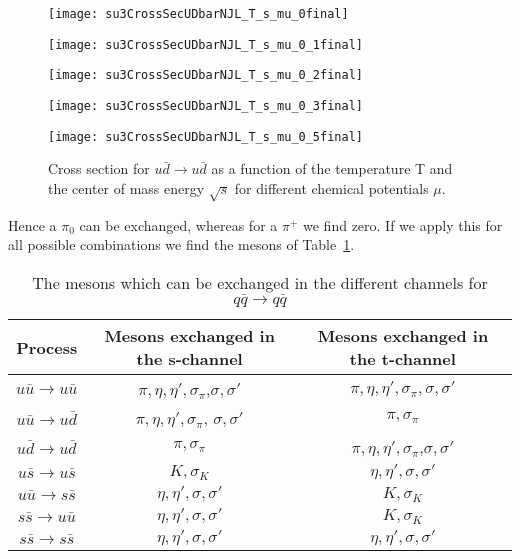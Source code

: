 \documentclass[a4paper]{jpconf}
\begin{document}
\begin{figure}[htp]%
\centering
\begin{minipage}{0.49\textwidth}
\centering
\texttt{[image: su3CrossSecUDbarNJL\_T\_s\_mu\_0final]}
\end{minipage}
\hfill
\begin{minipage}{0.49\textwidth}
\texttt{[image: su3CrossSecUDbarNJL\_T\_s\_mu\_0\_1final]}
\end{minipage}
\hfill
\begin{minipage}{0.49\textwidth}
\texttt{[image: su3CrossSecUDbarNJL\_T\_s\_mu\_0\_2final]}
\end{minipage}
\hfill
\begin{minipage}{0.49\textwidth}
\texttt{[image: su3CrossSecUDbarNJL\_T\_s\_mu\_0\_3final]}
\end{minipage}
\hfill
\begin{minipage}{0.49\textwidth}
\texttt{[image: su3CrossSecUDbarNJL\_T\_s\_mu\_0\_5final]}
\end{minipage}
\caption{\label{fig:udbar}Cross section for $u\bar{d} \rightarrow u\bar{d}$ as a function of the temperature T and the center of mass energy  $\sqrt{s}$ for different chemical potentials $\mu$.}
\end{figure}
Hence a $\pi_0$ can be exchanged, whereas for a $\pi^+$ we find zero. If we apply this for all possible combinations we find the mesons of Table~\ref{tab:qqbar}.
\begin{table}
\centering
\caption{\label{tab:qqbar}The mesons which can be exchanged in the different channels for  $q\bar{q}\rightarrow q\bar{q}$}
\begin{tabular}{|c | c | c |}
\hline
Process & Mesons exchanged in the s-channel & Mesons exchanged in the  t-channel \\ \hline
$u\bar{u} \rightarrow u\bar{u}$ &$ \pi, \eta, \eta',\sigma_{\pi}$,$ \sigma, \sigma' $&$ \pi, \eta, \eta',\sigma_{\pi}, \sigma, \sigma' $\\ \hline
$u\bar{u} \rightarrow u\bar{d}$ & $\pi, \eta, \eta',\sigma_{\pi}$, $\sigma, \sigma'$ & $ \pi, \sigma_{\pi} $\\ \hline
$u\bar{d} \rightarrow u\bar{d}$ & $   \pi, \sigma_{\pi} $ & $ \pi, \eta, \eta',\sigma_{\pi}$,$ \sigma, \sigma'  $ \\ \hline 
$u\bar{s} \rightarrow u\bar{s}$ &$ K, \sigma_K$ & $\eta, \eta',  \sigma, \sigma' $ \\ \hline
$u\bar{u} \rightarrow s\bar{s}$ & $\eta, \eta',  \sigma, \sigma'  $ & $K, \sigma_K $ \\ \hline
$s\bar{s} \rightarrow u\bar{u}$ & $ \eta, \eta',  \sigma, \sigma' $ & $K, \sigma_K $ \\ \hline
$s\bar{s} \rightarrow s\bar{s}$ &$\eta, \eta',  \sigma, \sigma' $ & $\eta, \eta',  \sigma, \sigma'$ \\ \hline
\end{tabular}
\end{table}
\end{document}
